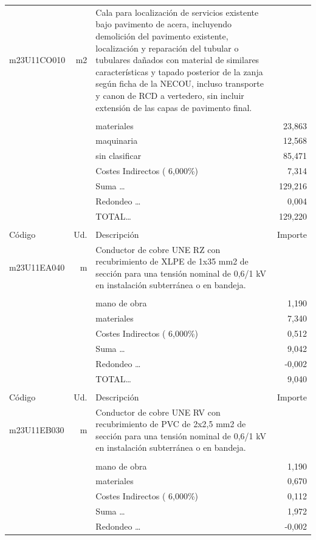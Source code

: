 \documentclass{book}%
\begin{document}
\begin{supertabular}{l r p{60mm} r}
\hline%
m23U11CO010&m2&Cala para localización de servicios existente bajo pavimento de acera, incluyendo demolición del pavimento existente, localización y reparación del tubular o tubulares dañados con material de similares características y tapado posterior de la zanja según ficha de la NECOU, incluso transporte y canon de RCD a vertedero, sin incluir extensión de las capas de pavimento final.&\\%
&&&\\%
&&materiales&    23,863\\%
&&maquinaria&    12,568\\%
&&sin clasificar&    85,471\\%
&&Costes Indirectos (     6,000\%)&     7,314\\%
&&Suma \ldots&   129,216\\%
&&Redondeo \ldots&     0,004\\%
%
&&TOTAL\ldots&   129,220\\%
&&&\\%
Código&Ud.&Descripción&Importe\\%
\hline%
m23U11EA040&m&Conductor de cobre UNE RZ con recubrimiento de XLPE de 1x35 mm2 de sección para una tensión nominal de 0,6/1 kV en instalación subterránea o en bandeja.&\\%
&&&\\%
&&mano de obra&     1,190\\%
&&materiales&     7,340\\%
&&Costes Indirectos (     6,000\%)&     0,512\\%
&&Suma \ldots&     9,042\\%
&&Redondeo \ldots&    {-}0,002\\%
%
&&TOTAL\ldots&     9,040\\%
&&&\\%
Código&Ud.&Descripción&Importe\\%
\hline%
m23U11EB030&m&Conductor de cobre UNE RV con recubrimiento de PVC de 2x2,5 mm2 de sección para una tensión nominal de 0,6/1 kV en instalación subterránea o en bandeja.&\\%
&&&\\%
&&mano de obra&     1,190\\%
&&materiales&     0,670\\%
&&Costes Indirectos (     6,000\%)&     0,112\\%
&&Suma \ldots&     1,972\\%
&&Redondeo \ldots&    {-}0,002\\%
%

\end{supertabular}
\end{document}
